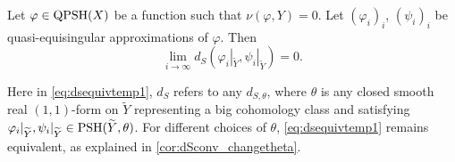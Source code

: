 \begin{proposition}\label{prop:traceindquasiequisingapp}
    Let $\varphi\in \mathrm{QPSH}(X)$ be a function such that $\nu(\varphi,Y)=0$. Let $(\varphi_i)_i$, $(\psi_i)_i$ be quasi-equisingular approximations of $\varphi$. Then
    \begin{equation}\label{eq:dsequivtemp1}
        \lim_{i\to\infty} d_S\left(\varphi_i|_{\widetilde{Y}},\psi_i|_{\widetilde{Y}}\right)=0.
    \end{equation}
\end{proposition}
Here in \eqref{eq:dsequivtemp1}, $d_S$ refers to any $d_{S,\theta}$, where $\theta$ is any closed smooth real $(1,1)$-form on $\widetilde{Y}$ representing a big cohomology class and satisfying $\varphi_i|_{\widetilde{Y}},\psi_i|_{\widetilde{Y}}\in \mathrm{PSH}(\widetilde{Y},\theta)$. For different choices of $\theta$, \eqref{eq:dsequivtemp1} remains equivalent, as explained in \cref{cor:dSconv_changetheta}.

